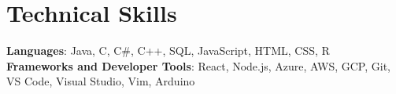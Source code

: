 \documentclass[letterpaper,11pt]{article}
\begin{document}
%
\section{Technical Skills}
 \begin{itemize}[leftmargin=0.15in, label={}]
    \small{\item{
     \textbf{Languages}{: Java, C, C\#, C++, SQL, JavaScript, HTML, CSS, R} \\
     \textbf{Frameworks and Developer Tools}{: React, Node.js, Azure, AWS, GCP, Git, VS Code, Visual Studio, Vim, Arduino} \\
    }}
 \end{itemize}


\end{document}
